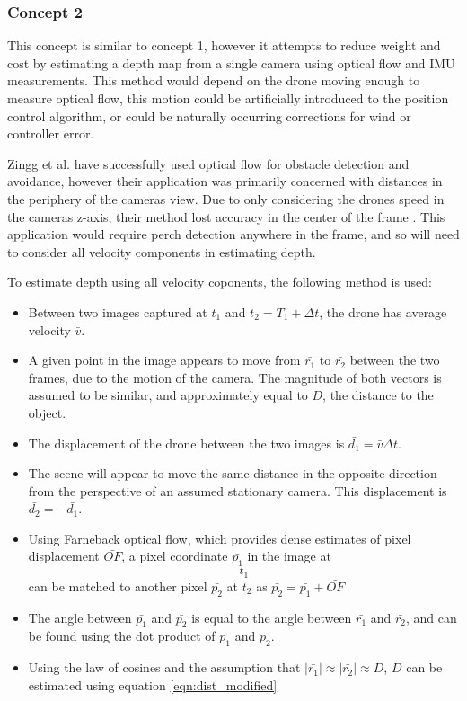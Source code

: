 \subsubsection{Concept 2}

This concept is similar to concept 1, however it attempts to reduce weight and cost by estimating
a depth map from a single camera using optical flow and IMU measurements. This method would depend on 
the drone moving enough to measure optical flow, this motion could be artificially introduced to the 
position control algorithm, or could be naturally occurring corrections for wind or controller error.

Zingg et al. have successfully used optical flow for obstacle detection and avoidance, however their application
was primarily concerned with distances in the periphery of the cameras view. Due to only considering 
the drones speed in the cameras z-axis, their method lost accuracy in the center of the frame \cite{zingg_mav_2010}.
This application would require perch detection anywhere in the frame, and so will need to consider all velocity components
in estimating depth.

To estimate depth using all velocity coponents, the following method is used:

\begin{itemize}
    \item Between two images captured at $t_1$ and $t_2 = T_1 + \Delta t$, the drone has average velocity $\bar{v}$.
    \item A given point in the image appears to move from $\bar{r_1}$ to $\bar{r_2}$ between the two frames,
            due to the motion of the camera. The magnitude of both vectors is assumed to be similar, and 
            approximately equal to $D$, the distance to the object.
    \item The displacement of the drone between the two images is $\bar{d_1} = \bar{v} \Delta t$.
    \item The scene will appear to move the same distance in the opposite direction from the perspective 
            of an assumed stationary camera. This displacement is $\bar{d_2} = -\bar{d_1}$.
    \item Using Farneback optical flow, which provides dense estimates of pixel displacement $\bar{OF}$,
            a pixel coordinate $\bar{p_1}$ in the image at $$t_1$$ can be matched to another pixel $\bar{p_2}$
            at $t_2$ as $\bar{p_2} = \bar{p_1} + \bar{OF}$
    \item The angle between $\bar{p_1}$ and $\bar{p_2}$ is equal to the angle between $\bar{r_1}$ and $\bar{r_2}$,
            and can be found using the dot product of $\bar{p_1}$ and $\bar{p_2}$.
    \item Using the law of cosines and the assumption that $|\bar{r_1}| \approx |\bar{r_2}| \approx D$,
            $D$ can be estimated using equation \ref{eqn:dist_modified}
\end{itemize}

